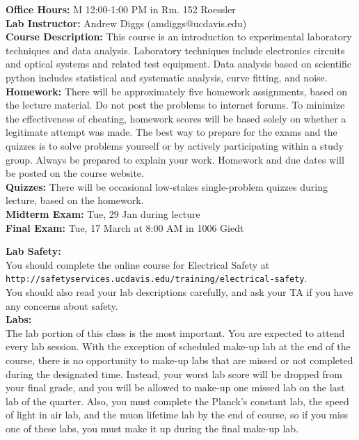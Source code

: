 \documentclass[12pt]{article}
\begin{document}
\noindent
\textbf{Office Hours:} M 12:00-1:00 PM in Rm. 152 Roessler\\

\noindent
\textbf{Lab Instructor:} Andrew Diggs (amdiggs@ucdavis.edu) \\

\noindent
\textbf {Course Description:}  
This course is an introduction to experimental laboratory techniques
and data analysis.  Laboratory techniques include electronics circuits
and optical systems and related test equipment.  Data analysis based
on scientific python includes statistical and systematic analysis,
curve fitting, and noise.\\

\noindent
\textbf{Homework:} 
There will be approximately five homework assignments, based on the
lecture material.  Do not post the problems to internet forums.  To
minimize the effectiveness of cheating, homework scores will be based
solely on whether a legitimate attempt was made.  The best way to
prepare for the exams and the quizzes is to solve problems yourself or
by actively participating within a study group.  Always be prepared to
explain your work.  Homework and due dates will be posted on the course website.\\

\noindent
\textbf{Quizzes:}  There will be occasional low-stakes single-problem quizzes during lecture, based on the homework.\\

\noindent
\textbf{Midterm Exam:} Tue, 29 Jan during lecture \\

\noindent
\textbf{Final Exam:} Tue, 17 March at 8:00 AM in 1006 Giedt \\

\newpage

\noindent
\textbf {Lab Safety:}\\
You should complete the online course for Electrical Safety at \\
{\tt http://safetyservices.ucdavis.edu/training/electrical-safety}.\\
You should also read your lab descriptions carefully, and ask your TA if you have any concerns about safety.\\

\noindent
\textbf {Labs:}\\
The lab portion of this class is the most important.  You are expected to attend every lab session.  With the exception of scheduled make-up lab at the end of the course, there is no opportunity to make-up labs that are missed or not completed during
the designated time.  Instead, your worst lab score will be dropped
from your final grade, and you will be allowed to make-up one missed
lab on the last lab of the quarter.  Also, you must complete the
Planck's constant lab, the speed of light in air lab, and the muon
lifetime lab by the end of course, so if you miss one of these labs,
you must make it up during the final make-up lab.
\end{document}
